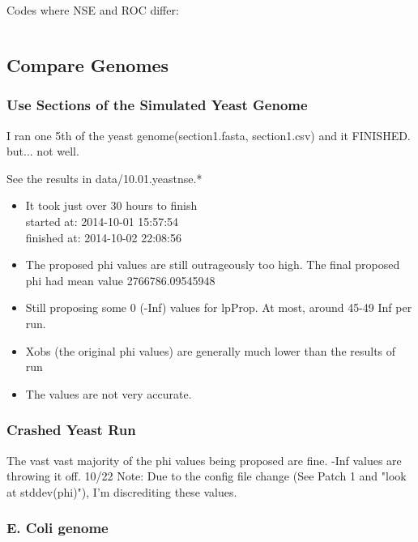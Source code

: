 Codes where NSE and ROC differ:
\begin{verbatim}
\end{verbatim}

\subsection{Compare Genomes}

\subsubsection{Use Sections of the Simulated Yeast Genome}
I ran one 5th of the yeast genome(section1.fasta, section1.csv) and it FINISHED. but... not well.

See the results in data/10.01.yeastnse.*

\begin{itemize}
\item It took just over 30 hours to finish\\
started at: 2014-10-01 15:57:54\\
finished at: 2014-10-02 22:08:56 

\item The proposed phi values are still outrageously too high. The final proposed phi had mean value 2766786.09545948

\item Still proposing some 0 (-Inf) values for lpProp. At most, around 45-49 Inf per run.

\item Xobs (the original phi values) are generally much lower than the results of run

\item The values are not very accurate.

\end{itemize}


\subsubsection{Crashed Yeast Run}

The vast vast majority of the phi values being proposed are fine. -Inf values are throwing it off. 
10/22 Note: Due to the config file change (See Patch 1 and "look at stddev(phi)"), I'm discrediting these values.


\subsubsection{E. Coli genome}

